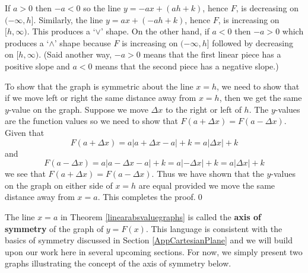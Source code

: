 \medskip

If $a > 0$ then $-a < 0$ so the line $y = -ax + (ah + k)$, hence $F$, is decreasing on $(-\infty, h]$.  Similarly,  the line $y = ax + (-ah + k)$, hence $F$, is increasing on $[h, \infty)$.  This produces a `$\vee$' shape.  On the other hand, if $a < 0$ then $-a > 0$ which produces a `$\wedge$' shape because $F$ is increasing on $(-\infty, h]$ followed by decreasing on $[h, \infty)$. (Said another way, $-a > 0$ means that the first linear piece has a positive slope and $a < 0$ means that the second piece has a negative slope.)

\medskip

To show that the graph is symmetric about the line $x = h$, we need to show that if we move left or right the same distance away from $x = h$, then we get the same $y$-value on the graph.  Suppose we move $\Delta x$ to the right or left of $h$.  The $y$-values are the function values so we need to show that $F(a + \Delta x) = F(a - \Delta x)$.   Given that \[F(a + \Delta x) = a| a + \Delta x - a| + k = a |\Delta x| + k\] and  \[F(a - \Delta x) = a | a - \Delta x - a| + k = a|-\Delta x| + k = a|\Delta x| + k\] we see that $F(a + \Delta x) = F(a - \Delta x)$. Thus we have shown that the $y$-values on the graph on either side of $x = h$ are equal provided we move the same distance away from $x = a$. This completes the proof.\qed

\medskip

The line $x = a$ in Theorem \ref{linearabsvaluegraphs} is called the  \textbf{axis of symmetry} of the graph of $y = F(x)$.  This language is consistent with the basics of symmetry discussed in Section \ref{AppCartesianPlane} and we will build upon our work here in several upcoming sections.  For now, we simply present two graphs illustrating the concept of the axis of symmetry below.

